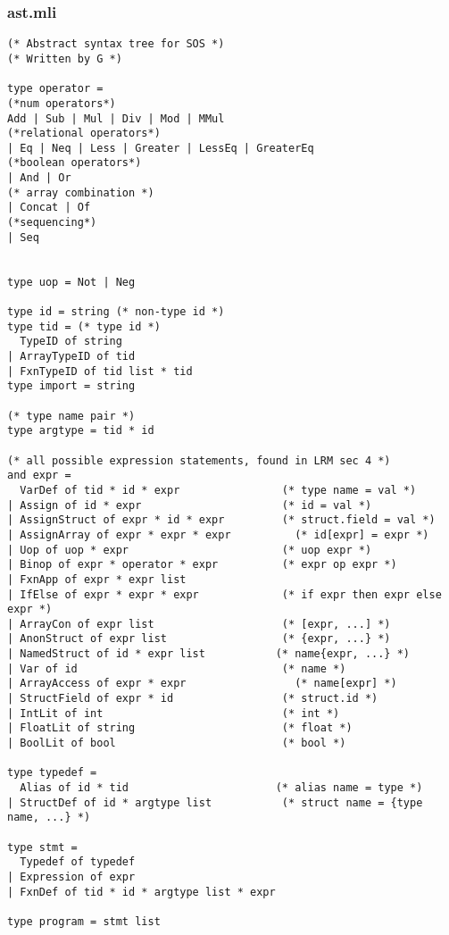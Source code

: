 \documentclass[main.tex]{subfiles}
\begin{document}
\subsubsection{ast.mli}
\begin{lstlisting}
(* Abstract syntax tree for SOS *)
(* Written by G *)

type operator = 
(*num operators*)
Add | Sub | Mul | Div | Mod | MMul
(*relational operators*)
| Eq | Neq | Less | Greater | LessEq | GreaterEq 
(*boolean operators*)
| And | Or 
(* array combination *)
| Concat | Of
(*sequencing*)
| Seq


type uop = Not | Neg

type id = string (* non-type id *)
type tid = (* type id *)
  TypeID of string
| ArrayTypeID of tid
| FxnTypeID of tid list * tid
type import = string

(* type name pair *)
type argtype = tid * id

(* all possible expression statements, found in LRM sec 4 *)
and expr = 
  VarDef of tid * id * expr                (* type name = val *)
| Assign of id * expr                      (* id = val *)
| AssignStruct of expr * id * expr         (* struct.field = val *)
| AssignArray of expr * expr * expr          (* id[expr] = expr *)
| Uop of uop * expr                        (* uop expr *)
| Binop of expr * operator * expr          (* expr op expr *)
| FxnApp of expr * expr list
| IfElse of expr * expr * expr             (* if expr then expr else expr *)
| ArrayCon of expr list                    (* [expr, ...] *)
| AnonStruct of expr list                  (* {expr, ...} *)
| NamedStruct of id * expr list           (* name{expr, ...} *)
| Var of id                                (* name *)
| ArrayAccess of expr * expr                 (* name[expr] *)
| StructField of expr * id                 (* struct.id *)
| IntLit of int                            (* int *)
| FloatLit of string                       (* float *)
| BoolLit of bool                          (* bool *)

type typedef = 
  Alias of id * tid                       (* alias name = type *)
| StructDef of id * argtype list           (* struct name = {type name, ...} *)

type stmt = 
  Typedef of typedef
| Expression of expr
| FxnDef of tid * id * argtype list * expr

type program = stmt list
\end{lstlisting}
\end{document}
